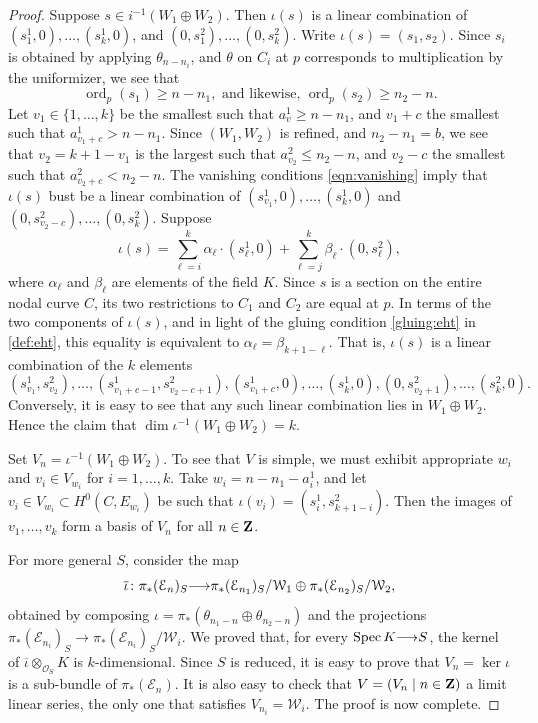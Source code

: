 \documentclass[11pt,reqno]{amsart}
\theoremstyle{plain}
\theoremstyle{definition}
\theoremstyle{remark}
\numberwithin{equation}{section}
\renewcommand{\to}{{\longrightarrow}}
\numberwithin{equation}{section}
\renewcommand{\O}{\mathcal O}
\DeclareMathOperator{\ord}{ord}
\begin{document}
\begin{proof}
  Suppose $s \in i^{-1}(W_1 \oplus W_2)$.
  Then $\iota(s)$ is a linear combination of $(s^1_1,0), \dots, (s^1_k, 0)$, and $(0, s^2_1), \dots, (0,s^2_k)$.
  Write $\iota(s) = (s_1, s_2)$.
  Since $s_i$ is obtained by applying $\theta_{n-n_i}$, and $\theta$ on $C_i$ at $p$ corresponds to multiplication by the uniformizer, we see that
  \begin{equation}\label{eqn:vanishing}
    \ord_p(s_1) \geq n - n_1, \text{ and likewise, } \ord_p(s_2) \geq n_2 - n.
  \end{equation}
  Let $v_1 \in \{1, \dots, k\}$ be the smallest such that $a^1_v \geq n-n_1$, and $v_1+c$ the smallest such that $a^1_{v_1+c} > n-n_1$.
  Since $(W_1, W_2)$ is refined, and $n_2 - n_1 = b$, we see that $v_2 = k+1-v_1$ is the largest such that $a^2_{v_2} \leq n_2 - n$, and $v_2 - c$ the smallest such that $a^2_{v_2 + c} < n_2 - n$.
  The vanishing conditions \eqref{eqn:vanishing} imply that $\iota(s)$ bust be a linear combination of $(s^1_{v_1},0), \dots, (s^1_k,0)$ and $(0, s^2_{v_2-c}), \dots,  (0,s^2_k)$.
  Suppose
  \[ \iota(s) = \sum_{\ell = i}^k \alpha_{\ell} \cdot (s^1_\ell,0) + \sum_{\ell = j}^{k} \beta_\ell \cdot (0,s^2_\ell),\]
  where $\alpha_{\ell}$ and $\beta_{\ell}$ are elements of the field $K$.
  Since $s$ is a section on the entire nodal curve $C$, its two restrictions to $C_1$ and $C_2$ are equal at $p$.
  In terms of the two components of $\iota(s)$, and in light of the gluing condition \eqref{gluing:eht} in \autoref{def:eht}, this equality is equivalent to $\alpha_{\ell} = \beta_{k+1-\ell}$.
  That is, $\iota(s)$ is a linear combination of the $k$ elements 
  \[ (s^1_{v_1} , s^2_{v_2}), \dots, (s^1_{v_1+c-1} , s^2_{v_2-c+1}), (s^1_{v_1+c},0), \dots, (s^1_k,0), (0,s^2_{v_2+1}), \dots, (s^2_{k},0).\]  
  Conversely, it is easy to see that any such linear combination lies in $W_1 \oplus W_2$.
  Hence the claim that $\dim \iota^{-1}(W_1 \oplus W_2) = k$.

  Set $V_n = \iota^{-1}(W_1 \oplus W_2)$.
  To see that $V$ is simple, we must exhibit appropriate $w_i$ and $v_i \in V_{w_i}$ for $i = 1, \dots, k$.
  Take $w_i = n-n_1-a^1_i$, and let $v_i \in V_{w_i} \subset H^0(C, E_{w_i})$ be such that $\iota(v_i) = (s^1_i, s^2_{k+1-i})$.
  Then the images of $v_1, \dots, v_k$ form a basis of $V_n$ for all $n \in {\bf Z}$.

  For more general $S$, consider the map
  \[ \overline \iota \from \pi_* (\mathcal E_n)_S \to \pi_*(\mathcal E_{n_1})_S / \mathcal W_1 \oplus \pi_*(\mathcal E_{n_2})_S / \mathcal W_2,\]
  obtained by composing $\iota = \pi_*(\theta_{n_1-n} \oplus \theta_{n_2-n})$ and the projections $\pi_*(\mathcal E_{n_i})_S \to \pi_*(\mathcal E_{n_i})_S / \mathcal W_i$.
  We proved that, for every $\spec K \to S$, the kernel of $\overline \iota \otimes_{\O_S} K$ is $k$-dimensional.
  Since $S$ is reduced, it is easy to prove that $V_n = \ker \iota$ is a sub-bundle of $\pi_*(\mathcal E_n)$.
  It is also easy to check that $V = (V_n \mid n \in {\bf Z})$ a limit linear series, the only one that satisfies $V_{n_i} = \mathcal W_i$.
  The proof is now complete.
\end{proof}
\end{document}
